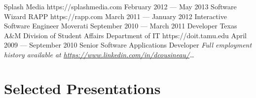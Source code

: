 \documentclass{resume}
\begin{document}
\employer
    {Splash Media}
    {https://splashmedia.com}
    {February 2012 --- May 2013}
    {Software Wizard}
    {}
\employer
    {RAPP}
    {https://rapp.com}
    {March 2011 --- January 2012}
    {Interactive Software Engineer}
    {}
\employer
    {Moverati}
    {}
    {September 2010 --- March 2011}
    {Developer}
    {}
\employer
    {Texas A\&M Division of Student Affairs Department of IT}
    {https://doit.tamu.edu}
    {April 2009 --- September 2010}
    {Senior Software Applications Developer}
    {}
\emph{Full employment history available at \href{https://www.linkedin.com/in/dcousineau/}{https://www.linkedin.com/in/dcousineau/}\ldots}


\section{Selected Presentations}
\end{document}
